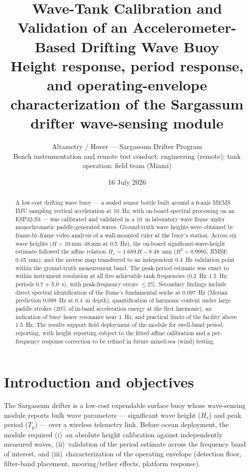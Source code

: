 \documentclass[11pt,a4paper]{article}
\title{\textbf{Wave-Tank Calibration and Validation of an Accelerometer-Based
Drifting Wave Buoy}\\[4pt]
\large Height response, period response, and operating-envelope characterization
of the Sargassum drifter wave-sensing module}
\author{Altametry / Hover --- Sargassum Drifter Program\\
\small Bench instrumentation and remote test conduct: engineering (remote); tank operation: field team (Miami)}
\date{16 July 2026}
\begin{document}
\maketitle

\begin{abstract}
\noindent
A low-cost drifting wave buoy --- a sealed sensor bottle built around a
6-axis MEMS IMU sampling vertical acceleration at \SI{10}{\hertz}, with
on-board spectral processing on an ESP32-S3 --- was calibrated and validated
in a \SI{10}{\meter} laboratory wave flume under monochromatic paddle-generated
waves. Ground-truth wave heights were obtained by frame-by-frame video analysis
of a wall-mounted ruler at the buoy's station. Across six wave heights
($H = \SIrange{10}{48}{\milli\meter}$ at \SI{0.5}{\hertz}), the on-board
significant-wave-height estimate followed the affine relation
$H_s = 1.689\,H - 8.48$~mm ($R^2 = 0.9995$, RMSE \SI{0.45}{\milli\meter}),
and the inverse map transferred to an independent \SI{0.4}{\hertz} validation
point within the ground-truth measurement band. The peak-period estimate was
exact to within instrument resolution at all five achievable tank frequencies
(\SIrange{0.2}{1.5}{\hertz}; periods \SIrange{0.7}{5.0}{\second}), with peak-frequency
errors $\le 2\%$. Secondary findings include direct spectral identification of
the flume's fundamental seiche at \SI{0.097}{\hertz} (Merian prediction
\SI{0.099}{\hertz} at \SI{0.4}{\meter} depth), quantification of harmonic
content under large paddle strokes (20\% of in-band acceleration energy at the
first harmonic), an indication of buoy heave resonance near \SI{1}{\hertz},
and practical limits of the facility above \SI{1.5}{\hertz}. The results
support field deployment of the module for swell-band period reporting, with
height reporting subject to the fitted affine calibration and a per-frequency
response correction to be refined in future mixed-sea (wind) testing.
\end{abstract}

\section{Introduction and objectives}
The Sargassum drifter is a low-cost expendable surface buoy whose wave-sensing
module reports bulk wave parameters --- significant wave height ($H_s$) and
peak period ($T_p$) --- over a wireless telemetry link. Before ocean
deployment, the module required (i)~an absolute height calibration against
independently measured waves, (ii)~validation of the period estimate across
the frequency band of interest, and (iii)~characterization of the operating
envelope (detection floor, filter-band placement, mooring/tether effects,
platform response).
\end{document}
